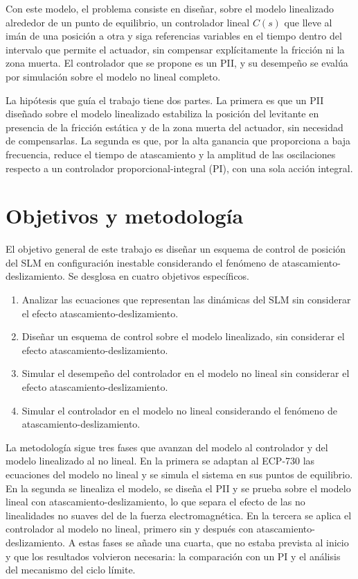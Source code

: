 Con este modelo, el problema consiste en diseñar, sobre el modelo linealizado alrededor de un punto de equilibrio, un controlador lineal $C(s)$ que lleve al imán de una posición a otra y siga referencias variables en el tiempo dentro del intervalo que permite el actuador, sin compensar explícitamente la fricción ni la zona muerta. El controlador que se propone es un PII, y su desempeño se evalúa por simulación sobre el modelo no lineal completo.

La hipótesis que guía el trabajo tiene dos partes. La primera es que un PII diseñado sobre el modelo linealizado estabiliza la posición del levitante en presencia de la fricción estática y de la zona muerta del actuador, sin necesidad de compensarlas. La segunda es que, por la alta ganancia que proporciona a baja frecuencia, reduce el tiempo de atascamiento y la amplitud de las oscilaciones respecto a un controlador proporcional-integral (PI), con una sola acción integral.

\section{Objetivos y metodología}\label{sec:objetivos}

El objetivo general de este trabajo es diseñar un esquema de control de posición del SLM en configuración inestable considerando el fenómeno de atascamiento-deslizamiento. Se desglosa en cuatro objetivos específicos.

\begin{enumerate}
  \item Analizar las ecuaciones que representan las dinámicas del SLM sin considerar el efecto atascamiento-deslizamiento.
  \item Diseñar un esquema de control sobre el modelo linealizado, sin considerar el efecto atascamiento-deslizamiento.
  \item Simular el desempeño del controlador en el modelo no lineal sin considerar el efecto atascamiento-deslizamiento.
  \item Simular el controlador en el modelo no lineal considerando el fenómeno de atascamiento-deslizamiento.
\end{enumerate}

La metodología sigue tres fases que avanzan del modelo al controlador y del modelo linealizado al no lineal. En la primera se adaptan al ECP-730 las ecuaciones del modelo no lineal y se simula el sistema en sus puntos de equilibrio. En la segunda se linealiza el modelo, se diseña el PII y se prueba sobre el modelo lineal con atascamiento-deslizamiento, lo que separa el efecto de las no linealidades no suaves del de la fuerza electromagnética. En la tercera se aplica el controlador al modelo no lineal, primero sin y después con atascamiento-deslizamiento. A estas fases se añade una cuarta, que no estaba prevista al inicio y que los resultados volvieron necesaria: la comparación con un PI y el análisis del mecanismo del ciclo límite.

